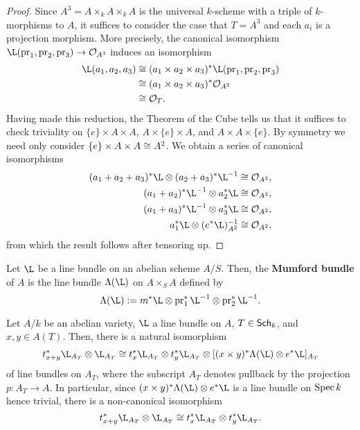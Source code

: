 \documentclass[11pt]{article}
\begin{document}
\begin{proof}
Since $A^3=A\times_kA\times_kA$ is the universal $k$-scheme with a triple of $k$-morphisms to $A$, it suffices to consider the case that $T=A^3$ and each $a_i$ is a projection morphism. More precisely, the canonical isomorphism $\L(\pr_1,\pr_2,\pr_3)\to\O_{A^3}$ induces an isomorphism 
\begin{align*}
\L(a_1,a_2,a_3)
&\iso(a_1\times a_2\times a_3)^*\L(\pr_1,\pr_2,\pr_3) \\
&\iso(a_1\times a_2\times a_3)^*\O_{A^3} \\
&\iso\O_T.
\end{align*}
Having made this reduction, the Theorem of the Cube tells us that it suffices to check triviality on $\{e\}\times A\times A$, $A\times\{e\}\times A$, and $A\times A\times\{e\}$. By symmetry we need only consider $\{e\}\times A\times A\cong A^2$. We obtain a series of canonical isomorphisms
\begin{align*}
(a_1+a_2+a_3)^*\L\tensor(a_2+a_3)^*\L^{-1}&\iso\O_{A^2}, \\
(a_1+a_2)^*\L^{-1}\tensor a_2^*\L&\iso\O_{A^2}, \\
(a_1+a_3)^*\L^{-1}\tensor a_3^*\L&\iso\O_{A^2}, \\
a_1^*\L\tensor(e^*\L)_{A^2}^{-1}&\iso\O_{A^2},
\end{align*}
from which the result follows after tensoring up.
\end{proof}

Let $\L$ be a line bundle on an abelian scheme $A/S$. Then, the \textbf{Mumford bundle} of $A$ is the line bundle $\Lambda(\L)$ on $A\times_SA$ defined by 
$$\Lambda(\L):=m^*\L\tensor\pr_1^*\L^{-1}\tensor\pr_2^*\L^{-1}.$$

\begin{theorem}\label{Square_Thm}
Let $A/k$ be an abelian variety, $\L$ a line bundle on $A$, $T\in\operatorname{\mathsf{Sch}}_k$, and $x,y\in A(T)$. Then, there is a natural isomorphism
\begin{align*}
t_{x+y}^*\L_{A_T}\tensor\L_{A_T}\iso t_x^*\L_{A_T}\tensor t_y^*\L_{A_T}
\tensor[(x\times y)^*\Lambda(\L)\tensor e^*\L]_{A_T}
\end{align*}
of line bundles on $A_T$, where the subscript $A_T$ denotes pullback by the projection $p: A_T\to A$. In particular, since $(x\times y)^*\Lambda(\L)\tensor e^*\L$ is a line bundle on $\operatorname{Spec} k$ hence trivial, there is a non-canonical isomorphism 
$$t_{x+y}^*\L_{A_T}\tensor\L_{A_T}\iso t_x^*\L_{A_T}\tensor t_y^*\L_{A_T}.$$
\end{theorem}
\end{document}

